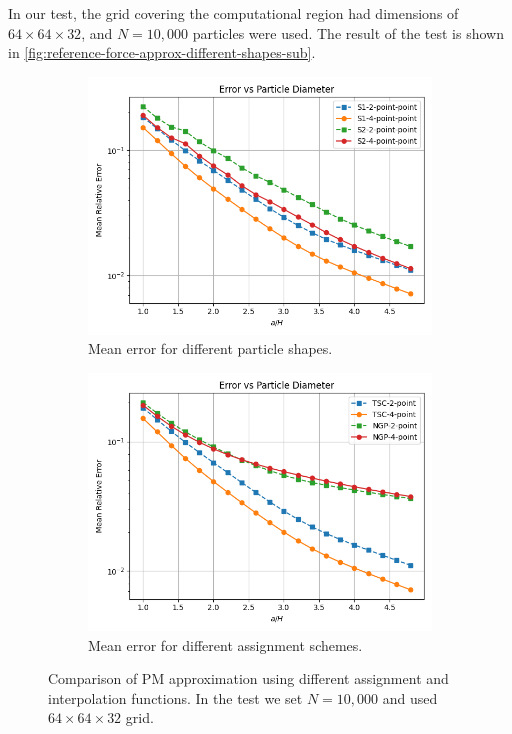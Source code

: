 In our test, the grid covering the computational region had dimensions of $64\times 64\times 32$, and $N=10{,}000$ particles were used.
The result of the test is shown in \autoref{fig:reference-force-approx-different-shapes-sub}.
\begin{figure}[htp]
    \centering
    \begin{subfigure}[b]{0.48\textwidth}
        \centering
        \includegraphics[width=\textwidth]{chapters/p3m-method/img/err_vs_part_diam_p3m.png}
        \caption{Mean error for different particle shapes.}
        \label{fig:reference-force-approx-different-shapes-sub}
    \end{subfigure}
    \hfill
    \begin{subfigure}[b]{0.48\textwidth}
        \centering
        \includegraphics[width=\textwidth]{chapters/p3m-method/img/no-cic.png}
        \caption{Mean error for different assignment schemes.}
        \label{fig:reference-force-error-different-schemes-sub}
    \end{subfigure}
    \caption{Comparison of PM approximation using different assignment and interpolation functions.
    In the test we set $N=10{,}000$ and used $64\times 64\times 32$ grid.
    }
    \label{fig:p3m-global-err-combined}
\end{figure}
